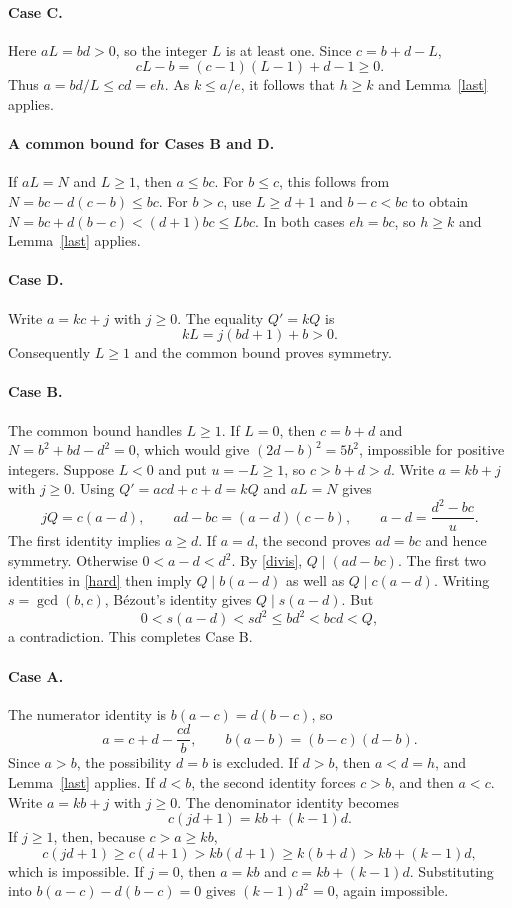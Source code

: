 \documentclass[11pt]{article}
\begin{document}
\paragraph{Case C.}
Here $aL=bd>0$, so the integer $L$ is at least one. Since
$c=b+d-L$,
\[
 cL-b=(c-1)(L-1)+d-1\ge0.
\]
Thus $a=bd/L\le cd=eh$. As $k\le a/e$, it follows that
$h\ge k$ and Lemma~\ref{last} applies.

\paragraph{A common bound for Cases B and D.}
If $aL=N$ and $L\ge1$, then $a\le bc$.
For $b\le c$, this follows from $N=bc-d(c-b)\le bc$.
For $b>c$, use $L\ge d+1$ and $b-c<bc$ to obtain
$N=bc+d(b-c)<(d+1)bc\le Lbc$.
In both cases $eh=bc$, so $h\ge k$ and Lemma~\ref{last} applies.

\paragraph{Case D.}
Write $a=kc+j$ with $j\ge0$. The equality $Q'=kQ$ is
\[
 kL=j(bd+1)+b>0.
\]
Consequently $L\ge1$ and the common bound proves symmetry.

\paragraph{Case B.}
The common bound handles $L\ge1$. If $L=0$, then $c=b+d$
and $N=b^2+bd-d^2=0$, which would give
$(2d-b)^2=5b^2$, impossible for positive integers.
Suppose $L<0$ and put $u=-L\ge1$, so $c>b+d>d$.
Write $a=kb+j$ with $j\ge0$. Using $Q'=acd+c+d=kQ$
and $aL=N$ gives
\begin{equation}\label{hard}
 jQ=c(a-d),\qquad ad-bc=(a-d)(c-b),\qquad
 a-d=\frac{d^2-bc}{u}.
\end{equation}
The first identity implies $a\ge d$. If $a=d$, the second proves
$ad=bc$ and hence symmetry. Otherwise $0<a-d<d^2$.
By \eqref{divis}, $Q\mid(ad-bc)$. The first two identities in
\eqref{hard} then imply $Q\mid b(a-d)$ as well as $Q\mid c(a-d)$.
Writing $s=\gcd(b,c)$, B\'ezout's identity gives $Q\mid s(a-d)$.
But
\[
 0<s(a-d)<sd^2\le bd^2<bcd<Q,
\]
a contradiction. This completes Case B.

\paragraph{Case A.}
The numerator identity is $b(a-c)=d(b-c)$, so
\[
 a=c+d-\frac{cd}{b},\qquad b(a-b)=(b-c)(d-b).
\]
Since $a>b$, the possibility $d=b$ is excluded.
If $d>b$, then $a<d=h$, and Lemma~\ref{last} applies.
If $d<b$, the second identity forces $c>b$, and then $a<c$.
Write $a=kb+j$ with $j\ge0$. The denominator identity becomes
\[
 c(jd+1)=kb+(k-1)d.
\]
If $j\ge1$, then, because $c>a\ge kb$,
\[
 c(jd+1)\ge c(d+1)>kb(d+1)\ge k(b+d)>kb+(k-1)d,
\]
which is impossible. If $j=0$, then $a=kb$ and
$c=kb+(k-1)d$. Substituting into $b(a-c)-d(b-c)=0$
gives $(k-1)d^2=0$, again impossible.
\end{document}
